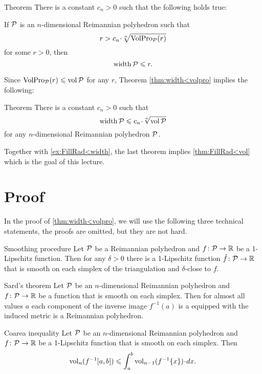 \begin{thm}{Theorem}\label{thm:width<volpro}
There is a constant $c_n>0$ such that the following holds true:

If $\mathcal{P}$ is an $n$-dimensional Reimannian polyhedron such that 
\[r> c_n\cdot \sqrt[n]{\VolPro_{\spc{P}}(r)}\] 
for some $r>0$, then 
\[\operatorname{\rm width}\nolimits\mathcal{P}\leqslant  r.\]
\end{thm}

Since $\operatorname{\rm VolPro}\nolimits_{\mathcal{P}}(r)\leqslant \operatorname{\rm vol}\nolimits\mathcal{P}$ for any $r$,
Theorem \ref{thm:width<volpro} implies the following:

\begin{thm}{Theorem}\label{thm:width<vol}
There is a constant $c_n>0$ such that 
\[\width\spc{P}\le c_n\cdot \sqrt[n]{\vol\spc{P}}\] 
for any  $n$-dimensional Reimannian polyhedron $\mathcal{P}$.
\end{thm}

Together with \ref{ex:FillRad<width}, the last theorem implies \ref{thm:FillRad<vol} which is the goal of this lecture.

\section{Proof}

In the proof of \ref{thm:width<volpro}, we will use the following three technical statements,
the proofs are omitted, but they are not hard. 

\begin{thm}{Smoothing procedure}
Let $\mathcal{P}$ be a Reimannian polyhedron and $f\colon\mathcal{P}\to \mathbb{R}$ be a 1-Lipschitz function.
Then for any $\delta>0$ there is a  1-Lipschitz function $\tilde f\colon\mathcal{P}\to \mathbb{R}$ that is smooth on each simplex of the triangulation and $\delta$-close to $f$.
\end{thm}

\begin{thm}{Sard's theorem}
Let $\mathcal{P}$ be an $n$-dimensional Reimannian polyhedron and $f\colon\mathcal{P}\to \mathbb{R}$ be a function that is smooth on each simplex.
Then for almost all values $a$ each component of the inverse image $f^{-1}(a)$ is a equipped with the induced metric is a Reimannian polyhedron.
\end{thm}


\begin{thm}{Coarea inequality}
Let $\mathcal{P}$ be an $n$-dimensional Reimannian polyhedron and $f\colon\mathcal{P}\to \mathbb{R}$ be a 1-Lipschitz function that is smooth on each simplex.
Then 
\[\vol_n (f^{-1}[a,b]) \le \int_a^b\vol_{n-1}(f^{-1}\{x\})\cdot dx.\]
\end{thm}

